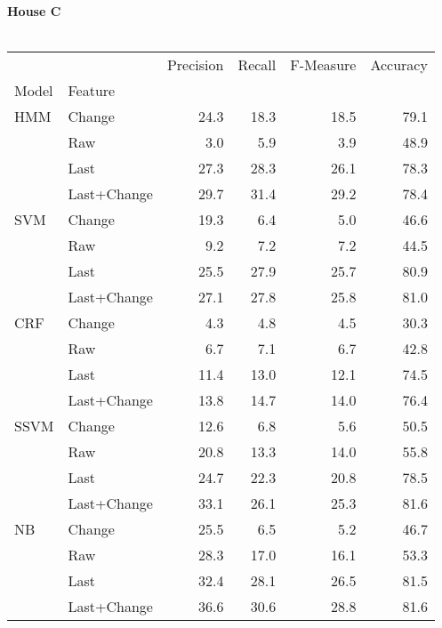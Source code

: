\documentclass{article}
\begin{document}
\textbf{House C}\\
\vspace{1cm}\\
\begin{tabular}{llrrrr}
\toprule
    &        &  Precision &  Recall &  F-Measure &  Accuracy \\
Model & Feature &            &         &            &           \\
\midrule
HMM & Change &       24.3 &    18.3 &       18.5 &      79.1 \\
    & Raw &        3.0 &     5.9 &        3.9 &      48.9 \\
    & Last &       27.3 &    28.3 &       26.1 &      78.3 \\
    & Last+Change &       29.7 &    31.4 &       29.2 &      78.4 \\
SVM & Change &       19.3 &     6.4 &        5.0 &      46.6 \\
    & Raw &        9.2 &     7.2 &        7.2 &      44.5 \\
    & Last &       25.5 &    27.9 &       25.7 &      80.9 \\
    & Last+Change &       27.1 &    27.8 &       25.8 &      81.0 \\
CRF & Change &        4.3 &     4.8 &        4.5 &      30.3 \\
    & Raw &        6.7 &     7.1 &        6.7 &      42.8 \\
    & Last &       11.4 &    13.0 &       12.1 &      74.5 \\
    & Last+Change &       13.8 &    14.7 &       14.0 &      76.4 \\
SSVM & Change &       12.6 &     6.8 &        5.6 &      50.5 \\
    & Raw &       20.8 &    13.3 &       14.0 &      55.8 \\
    & Last &       24.7 &    22.3 &       20.8 &      78.5 \\
    & Last+Change &       33.1 &    26.1 &       25.3 &      81.6 \\
NB & Change &       25.5 &     6.5 &        5.2 &      46.7 \\
    & Raw &       28.3 &    17.0 &       16.1 &      53.3 \\
    & Last &       32.4 &    28.1 &       26.5 &      81.5 \\
    & Last+Change &       36.6 &    30.6 &       28.8 &      81.6 \\
\bottomrule
\end{tabular}
\vspace{1cm}\\
\end{document}
